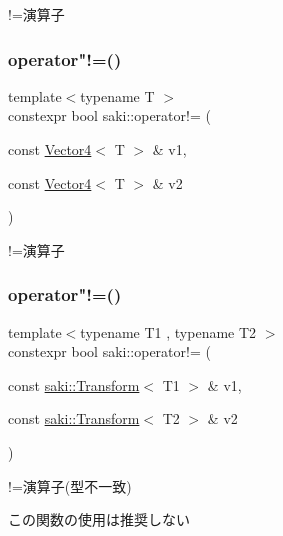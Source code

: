 !=演算子 

\mbox{\label{namespacesaki_a0d4a71a1a84ddfe22acf3ffd305f1449}} 
\subsubsection{\texorpdfstring{operator"!=()}{operator!=()}\hspace{0.1cm}{\footnotesize\ttfamily [4/11]}}
{\footnotesize\ttfamily template$<$typename T $>$ \\
constexpr bool saki\+::operator!= (\begin{DoxyParamCaption}\item[{const \mbox{\hyperlink{classsaki_1_1_vector4}{Vector4}}$<$ T $>$ \&}]{v1,  }\item[{const \mbox{\hyperlink{classsaki_1_1_vector4}{Vector4}}$<$ T $>$ \&}]{v2 }\end{DoxyParamCaption})}



!=演算子 

\mbox{\label{namespacesaki_abacbb997c38e24f818c0b63d26267aa3}} 
\subsubsection{\texorpdfstring{operator"!=()}{operator!=()}\hspace{0.1cm}{\footnotesize\ttfamily [5/11]}}
{\footnotesize\ttfamily template$<$typename T1 , typename T2 $>$ \\
constexpr bool saki\+::operator!= (\begin{DoxyParamCaption}\item[{const \mbox{\hyperlink{classsaki_1_1_transform}{saki\+::\+Transform}}$<$ T1 $>$ \&}]{v1,  }\item[{const \mbox{\hyperlink{classsaki_1_1_transform}{saki\+::\+Transform}}$<$ T2 $>$ \&}]{v2 }\end{DoxyParamCaption})}



!=演算子(型不一致) 

この関数の使用は推奨しない \mbox{\label{namespacesaki_a6ff1956703c2dfeebb0d188d9c34b033}} 
